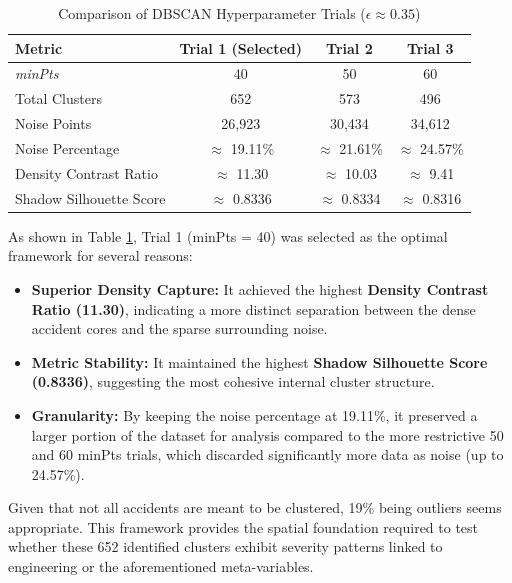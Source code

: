\documentclass[conference]{IEEEtran}
\begin{document}
\begin{table}[h!]
	\centering
	\begin{tabular}{|l|c|c|c|}
		\hline
		\textbf{Metric} & \textbf{Trial 1 (Selected)} & \textbf{Trial 2} & \textbf{Trial 3} \\ \hline
		\textit{minPts} & 40 & 50 & 60 \\ \hline
		Total Clusters & 652 & 573 & 496 \\ \hline
		Noise Points & 26,923 & 30,434 & 34,612 \\ \hline
		Noise Percentage & $\approx$ 19.11\% & $\approx$ 21.61\% & $\approx$ 24.57\% \\ \hline
		Density Contrast Ratio & $\approx$ 11.30 & $\approx$ 10.03 & $\approx$ 9.41 \\ \hline
		Shadow Silhouette Score & $\approx$ 0.8336 & $\approx$ 0.8334 & $\approx$ 0.8316 \\ \hline
	\end{tabular}
	\caption{Comparison of DBSCAN Hyperparameter Trials ($\epsilon \approx 0.35$)}
	\label{dbscan_results}
\end{table}

As shown in Table \ref{dbscan_results}, Trial 1 (minPts = 40) was selected as the optimal framework for several reasons:
\begin{itemize}
	\item \textbf{Superior Density Capture:} It achieved the highest \textbf{Density Contrast Ratio (11.30)}, indicating a more distinct separation between the dense accident cores and the sparse surrounding noise.
	\item \textbf{Metric Stability:} It maintained the highest \textbf{Shadow Silhouette Score (0.8336)}, suggesting the most cohesive internal cluster structure.
	\item \textbf{Granularity:} By keeping the noise percentage at 19.11\%, it preserved a larger portion of the dataset for analysis compared to the more restrictive 50 and 60 minPts trials, which discarded significantly more data as noise (up to 24.57\%).
\end{itemize} 

Given that not all accidents are meant to be clustered, 19\% being outliers seems appropriate. This framework provides the spatial foundation required to test whether these 652 identified clusters exhibit severity patterns linked to engineering or the aforementioned meta-variables.

\vspace{2mm}
\end{document}
